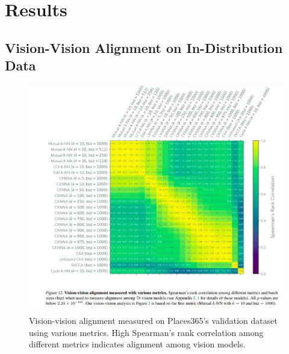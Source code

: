 \documentclass[10pt,a4paper]{article}
\begin{document}
\section{Results}

\subsection{Vision-Vision Alignment on In-Distribution Data}
\begin{figure}[H]
    \centering
    \includegraphics[width=\textwidth]{prh_correlation.jpg}
    \caption{Vision-vision alignment measured on Places365’s validation dataset using various metrics. High Spearman's rank correlation among different metrics indicates alignment among vision models.}
    \label{fig:prh_correlation}
\end{figure}
\end{document}
